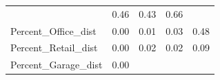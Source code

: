 \documentclass[]{article}
\begin{document}
\begin{longtable}[]{@{}lllll@{}}
\begin{minipage}[t]{0.08\columnwidth}
\end{minipage} & \begin{minipage}[t]{0.09\columnwidth}\raggedright\strut
0.46\strut
\end{minipage} & \begin{minipage}[t]{0.09\columnwidth}\raggedright\strut
0.43\strut
\end{minipage} & \begin{minipage}[t]{0.11\columnwidth}\raggedright\strut
0.66\strut
\end{minipage}\tabularnewline
\begin{minipage}[t]{0.49\columnwidth}\raggedright\strut
Percent\_Office\_dist\strut
\end{minipage} & \begin{minipage}[t]{0.08\columnwidth}\raggedright\strut
0.00\strut
\end{minipage} & \begin{minipage}[t]{0.09\columnwidth}\raggedright\strut
0.01\strut
\end{minipage} & \begin{minipage}[t]{0.09\columnwidth}\raggedright\strut
0.03\strut
\end{minipage} & \begin{minipage}[t]{0.11\columnwidth}\raggedright\strut
0.48\strut
\end{minipage}\tabularnewline
\begin{minipage}[t]{0.49\columnwidth}\raggedright\strut
Percent\_Retail\_dist\strut
\end{minipage} & \begin{minipage}[t]{0.08\columnwidth}\raggedright\strut
0.00\strut
\end{minipage} & \begin{minipage}[t]{0.09\columnwidth}\raggedright\strut
0.02\strut
\end{minipage} & \begin{minipage}[t]{0.09\columnwidth}\raggedright\strut
0.02\strut
\end{minipage} & \begin{minipage}[t]{0.11\columnwidth}\raggedright\strut
0.09\strut
\end{minipage}\tabularnewline
\begin{minipage}[t]{0.49\columnwidth}\raggedright\strut
Percent\_Garage\_dist\strut
\end{minipage} & \begin{minipage}[t]{0.08\columnwidth}\raggedright\strut
0.00\strut
\end{minipage} & \begin{minipage}[t]{0.09\columnwidth}\raggedright\strut

\end{minipage}
\end{longtable}
\end{document}
